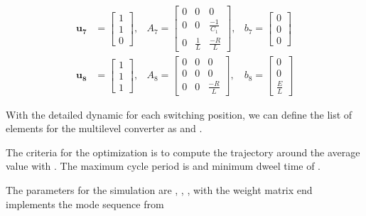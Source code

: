 \begin{equation}
\begin{matrix}
        \mathbf{u_7} &= \left[ \begin{array}{ccc} 1 \\ 1 \\ 0 \end{array} \right],
        &
        A_7 = \left[ \begin{array}{ccc} 
            0 & 0 & 0 \\
            0 & 0 & \frac{-1}{C_1} \\
            0 & \frac{1}{L} & \frac{-R}{L} 
        \end{array} \right],
        &
        b_7 = \left[ \begin{array}{c} 0 \\ 0 \\ 0 \end{array} \right] \\
        \mathbf{u_8} &= \left[ \begin{array}{ccc} 1 \\ 1 \\ 1 \end{array} \right],
        &
        A_8 = \left[ \begin{array}{ccc} 
            0 & 0 & 0 \\
            0 & 0 & 0 \\
            0 & 0 & \frac{-R}{L} 
        \end{array} \right],
        &
        b_8 = \left[ \begin{array}{c} 0 \\ 0 \\ \frac{E}{L} \end{array} \right]
    \end{matrix}
\end{equation}


With the detailed dynamic for each switching position, we can define the list of 
elements for the multilevel converter as  and 
 .


The criteria for the optimization is to compute the trajectory around the average value 
 with .
The maximum cycle period is  and minimum dweel time of 
. 

The parameters for the simulation are , 
, , 
 with the weight matrix 
end implements the mode sequence from 

